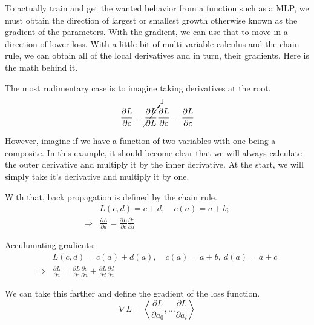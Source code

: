 To actually train and get the wanted behavior from a function such as a MLP, 
we must obtain the direction of largest or smallest growth 
otherwise known as the gradient of the parameters. With the gradient,
we can use that to move in a direction of lower loss. With a little bit
of multi-variable calculus and the chain rule, we can obtain all of the local derivatives
and in turn, their gradients. Here is the math behind it.

The most rudimentary case is to imagine taking derivatives at the root.
\begin{equation}
    \frac{\partial L}{\partial c} = \cancelto{1}{\frac{\partial L }{\partial L }} \frac{\partial L}{\partial c} = \frac{\partial L}{\partial c}
\end{equation}

However, imagine if we have a function of two variables with one being a composite.
In this example, it should become clear that we will always calculate the outer derivative and multiply it by the inner derivative.
At the start, we will simply take it's derivative and multiply it by one. 

\begin{definition}
    With that, back propagation is defined by the chain rule.
    \begin{align}
        & L(c, d) = c + d, \quad  c(a) = a+b; \\
        \Longrightarrow  & \boxed{\frac{\partial L}{\partial a} = \frac{\partial L }{\partial c } \frac{\partial c}{\partial a}}
    \end{align}

    Acculumating gradients:
    \begin{align}
        & L(c, d) = c(a) + d(a), \quad c(a) = a + b, \ d(a) = a + c\\
       \Longrightarrow & \boxed{\frac{\partial L}{\partial a} =\frac{\partial L}{\partial c}\frac{\partial c}{\partial a}+\frac{\partial L}{\partial d}\frac{\partial d}{\partial a}}
    \end{align}
\end{definition}

\begin{definition}[Gradient]
    We can take this farther and define the gradient of the loss function.
        \begin{equation}
        \boxed{\nabla L = \left\langle \frac{\partial L}{\partial a_0}, \dots \frac{\partial L}{\partial a_i} \right\rangle}
    \end{equation}
\end{definition}

